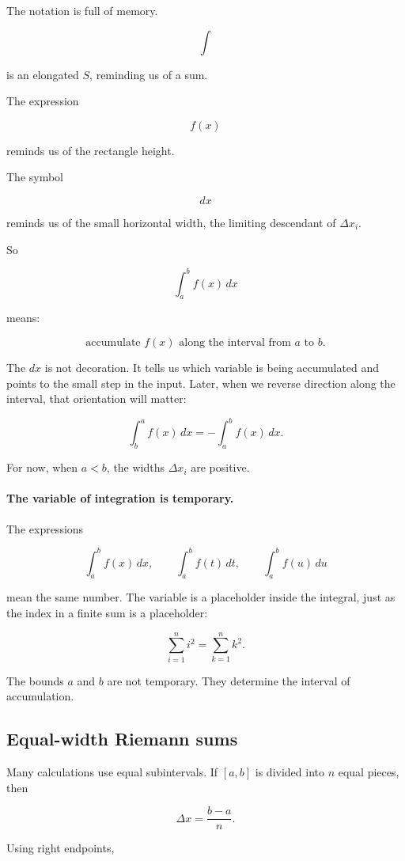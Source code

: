 The notation is full of memory.

\[
\int
\]

is an elongated \(S\), reminding us of a sum.

The expression

\[
f(x)
\]

reminds us of the rectangle height.

The symbol

\[
dx
\]

reminds us of the small horizontal width, the limiting descendant of \(\Delta x_i\).

So

\[
\int_a^b f(x)\,dx
\]

means:

\[
\text{accumulate \(f(x)\) along the interval from \(a\) to \(b\).}
\]

The \(dx\) is not decoration.  It tells us which variable is being accumulated and
points to the small step in the input.  Later, when we reverse direction along the
interval, that orientation will matter:

\[
\int_b^a f(x)\,dx=-\int_a^b f(x)\,dx.
\]

For now, when \(a<b\), the widths \(\Delta x_i\) are positive.

\paragraph{The variable of integration is temporary.}
The expressions

\[
\int_a^b f(x)\,dx,
\qquad
\int_a^b f(t)\,dt,
\qquad
\int_a^b f(u)\,du
\]

mean the same number.  The variable is a placeholder inside the integral, just as the
index in a finite sum is a placeholder:

\[
\sum_{i=1}^{n} i^2
=
\sum_{k=1}^{n} k^2.
\]

The bounds \(a\) and \(b\) are not temporary.  They determine the interval of
accumulation.

\subsection{Equal-width Riemann sums}
\label{subsec:equal-width-riemann-sums}

Many calculations use equal subintervals.  If \([a,b]\) is divided into \(n\) equal
pieces, then

\[
\Delta x=\frac{b-a}{n}.
\]

Using right endpoints,

